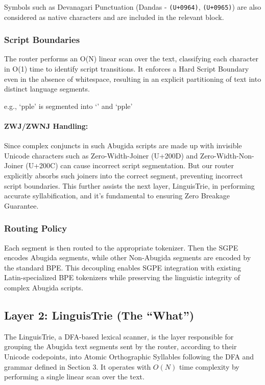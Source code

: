 Symbols such as Devanagari Punctuation (Dandas - \texttt{(U+0964)}, \texttt{(U+0965)}) are also considered as native characters and are included in the relevant block.

\subsubsection{Script Boundaries}
The router performs an O(N) linear scan over the text, classifying each character in O(1) time to identify script transitions. It enforces a Hard Script Boundary even in the absence of whitespace, resulting in an explicit partitioning of text into distinct language segments.
\begin{center}
e.g., `pple' is segmented into `' and `pple'
\end{center}

\paragraph{ZWJ/ZWNJ Handling:} 
Since complex conjuncts in such Abugida scripts are made up with invisible Unicode characters such as Zero-Width-Joiner (U+200D) and Zero-Width-Non-Joiner (U+200C) can cause incorrect script segmentation. But our router explicitly absorbs such joiners into the correct segment, preventing incorrect script boundaries. This further assists the next layer, LinguisTrie, in performing accurate syllabification, and it's fundamental to ensuring Zero Breakage Guarantee.

\subsubsection{Routing Policy}
Each segment is then routed to the appropriate tokenizer. Then the SGPE encodes Abugida segments, while other Non-Abugida segments are encoded by the standard BPE. This decoupling enables SGPE integration with existing Latin-specialized BPE tokenizers while preserving the linguistic integrity of complex Abugida scripts.

\subsection{Layer 2: LinguisTrie (The ``What'')}
The LinguisTrie, a DFA-based lexical scanner, is the layer responsible for grouping the Abugida text segments sent by the router, according to their Unicode codepoints, into Atomic Orthographic Syllables following the DFA and grammar defined in Section 3.  It operates with $O(N)$ time complexity by performing a single linear scan over the text.

